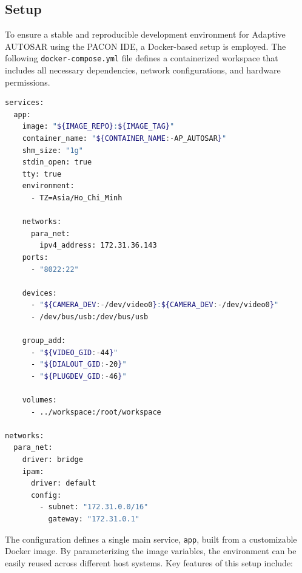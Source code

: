 \subsection{Setup}

To ensure a stable and reproducible development environment for Adaptive AUTOSAR using the PACON IDE, a Docker-based setup is employed. The following \texttt{docker-compose.yml} file defines a containerized workspace that includes all necessary dependencies, network configurations, and hardware permissions.

\begin{lstlisting}[language=bash, caption={Docker Compose configuration for PACON IDE environment}]
services:
  app:
    image: "${IMAGE_REPO}:${IMAGE_TAG}"
    container_name: "${CONTAINER_NAME:-AP_AUTOSAR}"
    shm_size: "1g"
    stdin_open: true
    tty: true
    environment:
      - TZ=Asia/Ho_Chi_Minh

    networks:
      para_net:
        ipv4_address: 172.31.36.143
    ports:
      - "8022:22"

    devices:
      - "${CAMERA_DEV:-/dev/video0}:${CAMERA_DEV:-/dev/video0}"
      - /dev/bus/usb:/dev/bus/usb

    group_add:
      - "${VIDEO_GID:-44}"
      - "${DIALOUT_GID:-20}"
      - "${PLUGDEV_GID:-46}"

    volumes:
      - ../workspace:/root/workspace

networks:
  para_net:
    driver: bridge
    ipam:
      driver: default
      config:
        - subnet: "172.31.0.0/16"
          gateway: "172.31.0.1"
\end{lstlisting}

The configuration defines a single main service, \texttt{app}, built from a customizable Docker image. By parameterizing the image variables, the environment can be easily reused across different host systems. Key features of this setup include:

